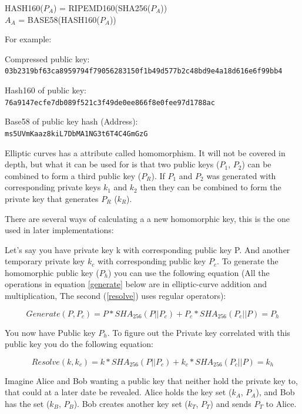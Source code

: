 HASH160($P_A$) = RIPEMD160(SHA256($P_A$))\\
$A_A$ = BASE58(HASH160($P_A$))

For example:

Compressed public key:\\
\texttt{03b2319bf63ca8959794f79056283150f1b49d577b2c48bd9e4a18d616e6f99bb4}

Hash160 of public key:\\
\texttt{76a9147ecfe7db089f521c3f49de0ee866f8e0fee97d1788ac}

Base58 of public key hash (Address):\\
\texttt{ms5UVmKaaz8kiL7DbMA1NG3t6T4C4GmGzG}

\label{homomorphism}
Elliptic curves has a attribute called homomorphism. It will not be covered in depth, but what it can be used for is that two public keys ($P_1$, $P_2$) can be combined to form a third public key ($P_R$). If $P_1$ and $P_2$ was generated with corresponding private keys $k_1$ and $k_2$ then they can be combined to form the private key that generates $P_R$ ($k_R$).

There are several ways of calculating a a new homomorphic key, this is the one used in later implementations:

Let's say you have private key k with corresponding public key P. And another temporary private key $k_c$ with corresponding public key $P_c$. To generate the homomorphic public key ($P_h$) you can use the following equation (All the operations in equation \ref{generate} below are in elliptic-curve addition and multiplication, The second (\ref{resolve}) uses regular operators):

\begin{equation}\label{generate}
Generate(P, P_c) = P * SHA_{256}(P || P_c) + P_c * SHA_{256}(P_c || P) = P_h
\end{equation}

You now have Public key $P_h$. To figure out the Private key correlated with this public key you do the following equation:

\begin{equation}\label{resolve}
Resolve(k, k_c) = k * SHA_{256}(P || P_c) + k_c * SHA_{256}(P_c || P) = k_h
\end{equation}

Imagine Alice and Bob wanting a public key that neither hold the private key to, that could at a later date be revealed. Alice holds the key set ($k_A$, $P_A$), and Bob has the set ($k_B$, $P_B$). Bob creates another key set ($k_T$, $P_T$) and sends $P_T$ to Alice.

